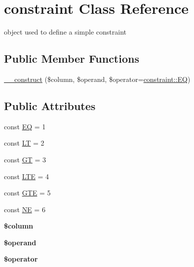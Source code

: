 \hypertarget{classconstraint}{}\section{constraint Class Reference}
\label{classconstraint}


object used to define a simple constraint  


\subsection*{Public Member Functions}
\begin{DoxyCompactItemize}
\item 
\hyperlink{classconstraint_a9e4321b5cf73af8119e6ecaac6069bbc}{\+\_\+\+\_\+construct} (\$column, \$operand, \$operator=\hyperlink{classconstraint_ac28f80db55e3b33606f846cf0b2938d5}{constraint\+::\+E\+Q})
\end{DoxyCompactItemize}
\subsection*{Public Attributes}
\begin{DoxyCompactItemize}
\item 
const \hyperlink{classconstraint_ac28f80db55e3b33606f846cf0b2938d5}{E\+Q} = 1
\item 
const \hyperlink{classconstraint_a356487cccf4f7e43df1cedf5c4b494eb}{L\+T} = 2
\item 
const \hyperlink{classconstraint_a0bc0ebe8be69587ccea58b06117a76ca}{G\+T} = 3
\item 
const \hyperlink{classconstraint_a869d7d56db8db1bd423e5664c40d9251}{L\+T\+E} = 4
\item 
const \hyperlink{classconstraint_a7271610e95f862dfcbfeebdc22c1be05}{G\+T\+E} = 5
\item 
const \hyperlink{classconstraint_a7e396087ac8d1599de8c52809d56f601}{N\+E} = 6
\item 
\hypertarget{classconstraint_abc8fe64f40466c5b37dd6a838c933719}{}{\bfseries \$column}\label{classconstraint_abc8fe64f40466c5b37dd6a838c933719}

\item 
\hypertarget{classconstraint_ab33b4969b915bffa79091808a0a18041}{}{\bfseries \$operand}\label{classconstraint_ab33b4969b915bffa79091808a0a18041}

\item 
\hypertarget{classconstraint_a04b94733df3431f1e39462de1afe845a}{}{\bfseries \$operator}\label{classconstraint_a04b94733df3431f1e39462de1afe845a}

\end{DoxyCompactItemize}


